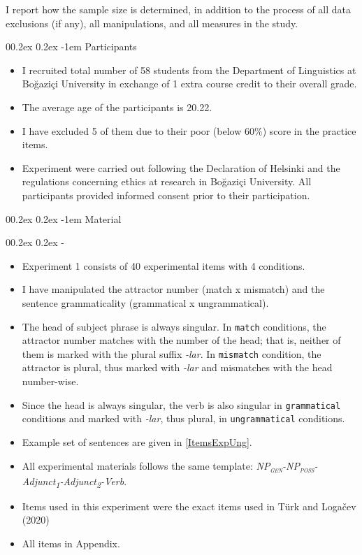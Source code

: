 \documentclass[
  10pt,
  english,
  doc,floatsintext]{apa6}
\makeatletter
\providecommand{\tightlist}{%
  \setlength{\itemsep}{0pt}\setlength{\parskip}{0pt}}
\let\oldparagraph\paragraph
\renewcommand{\paragraph}[1]{\oldparagraph{#1}\mbox{}}
\let\oldsubparagraph\subparagraph
\renewcommand{\subparagraph}[1]{\oldsubparagraph{#1}\mbox{}}
\renewcommand{\paragraph}{\@startsection{paragraph}{4}{\parindent}%
  {0\baselineskip \@plus 0.2ex \@minus 0.2ex}%
  {-1em}%
  {\normalfont\normalsize\bfseries\itshape\typesectitle}}
\renewcommand{\subparagraph}[1]{\@startsection{subparagraph}{5}{1em}%
  {0\baselineskip \@plus 0.2ex \@minus 0.2ex}%
  {-\z@\relax}%
  {\normalfont\normalsize\itshape\hspace{\parindent}{#1}\textit{\addperi}}{\relax}}
\makeatother
\begin{document}
I report how the sample size is determined, in addition to the process of all data exclusions (if any), all manipulations, and all measures in the study.

\hypertarget{participants}{%
\paragraph{Participants}\label{participants}}

\begin{itemize}
\tightlist
\item
  I recruited total number of 58 students from the Department of Linguistics at Boğaziçi University in exchange of 1 extra course credit to their overall grade.
\item
  The average age of the participants is 20.22.
\item
  I have excluded 5 of them due to their poor (below 60\%) score in the practice items.
\item
  Experiment were carried out following the Declaration of Helsinki and the regulations concerning ethics at research in Bo\u{g}azi\c{c}i University. All participants provided informed consent prior to their participation.
\end{itemize}

\hypertarget{material}{%
\paragraph{Material}\label{material}}

\hypertarget{experimental-items}{%
\subparagraph{Experimental Items}\label{experimental-items}}

\begin{itemize}
\tightlist
\item
  Experiment 1 consists of 40 experimental items with 4 conditions.
\item
  I have manipulated the attractor number (match x mismatch) and the sentence grammaticality (grammatical x ungrammatical).
\item
  The head of subject phrase is always singular. In \texttt{match} conditions, the attractor number matches with the number of the head; that is, neither of them is marked with the plural suffix \emph{-lar}. In \texttt{mismatch} condition, the attractor is plural, thus marked with \emph{-lar} and mismatches with the head number-wise.
\item
  Since the head is always singular, the verb is also singular in \texttt{grammatical} conditions and marked with \emph{-lar}, thus plural, in \texttt{ungrammatical} conditions.
\item
  Example set of sentences are given in \ref{ItemsExpUng}.
\item
  All experimental materials follows the same template: \newline \emph{NP\textsubscript{\textsc{gen}}-NP\textsubscript{\textsc{poss}}-Adjunct\textsubscript{1}-Adjunct\textsubscript{2}-Verb}.
\item
  Items used in this experiment were the exact items used in Türk and Logačev (2020)
\item
  All items in Appendix.
\end{itemize}
\end{document}
